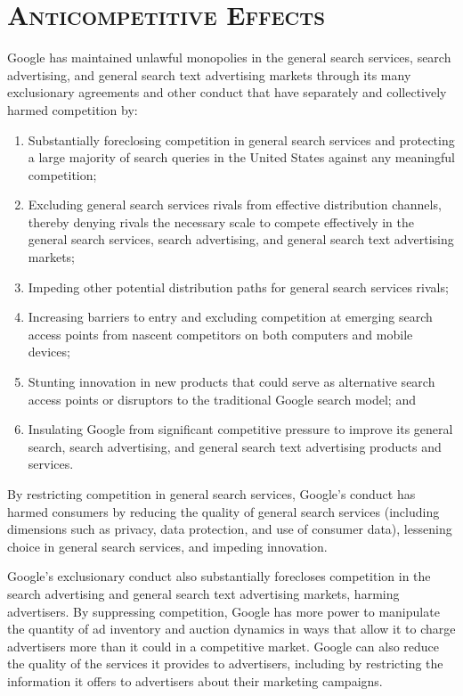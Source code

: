 \documentclass[11pt,b5paper,headings=small]{scrartcl}
\begin{document}
\section{\textsc{Anticompetitive Effects}}
Google has maintained unlawful monopolies in the general search services, search
advertising, and general search text advertising markets through its many exclusionary
agreements and other conduct that have separately and collectively harmed competition by:
\begin{enumerate}
\item
Substantially foreclosing competition in general search services and
protecting a large majority of search queries in the United States against
any meaningful competition;
\item
Excluding general search services rivals from effective distribution
channels, thereby denying rivals the necessary scale to compete effectively
in the general search services, search advertising, and general search text
advertising markets;
\item
Impeding other potential distribution paths for general search services
rivals;
\item
Increasing barriers to entry and excluding competition at emerging search
access points from nascent competitors on both computers and mobile
devices;
\item
Stunting innovation in new products that could serve as alternative search
access points or disruptors to the traditional Google search model; and
\item
Insulating Google from significant competitive pressure to improve its
general search, search advertising, and general search text advertising
products and services.
\end{enumerate}


By restricting competition in general search services, Google’s conduct has
harmed consumers by reducing the quality of general search services (including dimensions such
as privacy, data protection, and use of consumer data), lessening choice in general search
services, and impeding innovation.


Google’s exclusionary conduct also substantially forecloses competition in the
search advertising and general search text advertising markets, harming advertisers. By
suppressing competition, Google has more power to manipulate the quantity of ad inventory and
auction dynamics in ways that allow it to charge advertisers more than it could in a competitive
market. Google can also reduce the quality of the services it provides to advertisers, including by
restricting the information it offers to advertisers about their marketing campaigns.
\end{document}
